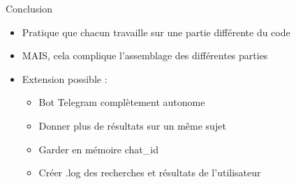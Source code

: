 \documentclass[
  ignorenonframetext,
]{beamer}
\providecommand{\tightlist}{%
  \setlength{\itemsep}{0pt}\setlength{\parskip}{0pt}}
\begin{document}
\begin{frame}{Conclusion}
\protect\hypertarget{conclusion}{}
\begin{itemize}
\tightlist
\item
  Pratique que chacun travaille sur une partie différente du code
\item
  MAIS, cela complique l'assemblage des différentes parties
\item
  Extension possible :

  \begin{itemize}
  \tightlist
  \item
    Bot Telegram complètement autonome
  \item
    Donner plus de résultats sur un même sujet
  \item
    Garder en mémoire chat\_id
  \item
    Créer .log des recherches et résultats de l'utilisateur
  \end{itemize}
\end{itemize}
\end{frame}
\end{document}
